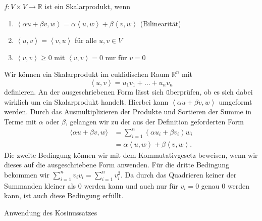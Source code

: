 \begin{Def}
$f:V\times V \rightarrow\mathbb{R}$ ist ein Skalarprodukt, wenn\\
\begin{enumerate}
\item $\left\langle  \alpha u + \beta v, w\right\rangle = \alpha \left\langle  u,w\right\rangle + \beta \left\langle  v,w\right\rangle $ (Bilinearität)
\item $\left\langle  u,v\right\rangle = \left\langle  v,u\right\rangle $ für alle $u,v \in V$
\item $\left\langle  v,v\right\rangle \geq 0$ mit $\left\langle  v,v\right\rangle = 0$ nur für $v = 0$
\end{enumerate}
\end{Def}
Wir können ein Skalarprodukt im euklidischen Raum $\mathbb{R}^n$ mit
\begin{equation}
\left\langle u,v\right\rangle  = u_1 v_1 + \dots + u_n v_n
\label{skal}
\end{equation}
definieren. An der ausgeschriebenen Form lässt sich überprüfen, ob es sich dabei wirklich um ein Skalarprodukt handelt. Hierbei kann  $\left\langle \alpha u + \beta v, w\right\rangle $  umgeformt werden. Durch das Ausmultiplizieren der Produkte und Sortieren der Summe in Terme mit $\alpha$ oder  $\beta$, gelangen wir zu der aus der Definition geforderten Form 
\begin{align*}
\langle \alpha u + \beta v, w\rangle &= \sum_{i=1}^n (\alpha u_i + \beta v_i)w_i \\
&= \alpha \left\langle u,w\right\rangle  + \beta \left\langle v,w\right\rangle .
\end{align*}
Die zweite Bedingung können wir mit dem Kommutativgesetz beweisen, wenn wir dieses auf die ausgeschriebene Form anwenden.
Für die dritte Bedingung bekommen wir $\sum_{i=1}^n v_i v_i = \sum_{i=1}^n v_i^2$. Da durch das Quadrieren keiner der Summanden kleiner als 0 werden kann und auch nur für $v_i = 0$ genau 0 werden kann, ist auch diese Bedingung erfüllt.

\begin{dsafigure}
\centering
{}
\caption {Anwendung des Kosinussatzes}
\label{Kosinussatz}
\end{dsafigure}

